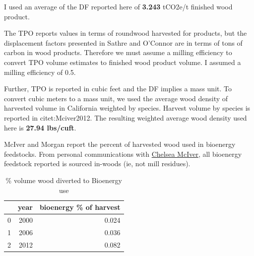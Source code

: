 \documentclass[a4paper]{article}
\begin{document}
I used an average of the DF reported here of \textbf{3.243} tCO2e/t finished
wood product.


The TPO reports values in terms of roundwood harvested for products, but the
displacement factors presented in Sathre and O'Connor are in terms of
tons of carbon in wood products. Therefore we must assume a milling
efficiency to convert TPO volume estimates to finished wood product volume. I assumed
a milling efficiency of 0.5.


Further, TPO is reported in cubic feet and the DF implies a mass
unit. To convert cubic meters to a mass unit, we used the average wood
density of harvested volume in California weighted by species. Harvest
volume by species is reported in citet:Mciver2012. The resulting weighted average wood density used here is \textbf{27.94
lbs/cuft}.


McIver and Morgan report the percent of harvested wood used in bioenergy
feedstocks. From personal communications with
\href{http://www.bber.umt.edu/staff/mciver.asp}{Chelsea McIver}, all bioenergy feedstock reported is sourced in-woods (ie, not mill
residues).

\begin{table}[htb]
\caption{\% volume wood diverted to Bioenergy use}
\centering
\begin{tabular}{rrr}
 & year & bioenergy \% of harvest\\
\hline
0 & 2000 & 0.024\\
1 & 2006 & 0.036\\
2 & 2012 & 0.082\\
\end{tabular}
\end{table}
\end{document}
